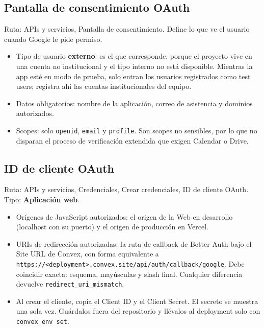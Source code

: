 \documentclass[11pt,a4paper]{article}
\begin{document}
\subsection{Pantalla de consentimiento OAuth}

Ruta: APIs y servicios, Pantalla de consentimiento. Define lo que ve el
usuario cuando Google le pide permiso.

\begin{itemize}
  \item Tipo de usuario \textbf{externo}: es el que corresponde, porque el
    proyecto vive en una cuenta no institucional y el tipo interno no está
    disponible. Mientras la app esté en modo de prueba, solo entran los
    usuarios registrados como test users; registra ahí las cuentas
    institucionales del equipo.
  \item Datos obligatorios: nombre de la aplicación, correo de asistencia y
    dominios autorizados.
  \item Scopes: solo \texttt{openid}, \texttt{email} y \texttt{profile}. Son
    scopes no sensibles, por lo que no disparan el proceso de verificación
    extendida que exigen Calendar o Drive.
\end{itemize}

\subsection{ID de cliente OAuth}

Ruta: APIs y servicios, Credenciales, Crear credenciales, ID de cliente
OAuth. Tipo: \textbf{Aplicación web}.

\begin{itemize}
  \item Orígenes de JavaScript autorizados: el origen de la Web en desarrollo
    (localhost con su puerto) y el origen de producción en Vercel.
  \item URIs de redirección autorizadas: la ruta de callback de Better Auth
    bajo el Site URL de Convex, con forma equivalente a
    \texttt{https://<deployment>.convex.site/api/auth/callback/google}.
    Debe coincidir exacta: esquema, mayúsculas y slash final. Cualquier
    diferencia devuelve \texttt{redirect\_uri\_mismatch}.
  \item Al crear el cliente, copia el Client ID y el Client Secret. El secreto
    se muestra una sola vez. Guárdalos fuera del repositorio y llévalos al
    deployment solo con \texttt{convex env set}.
\end{itemize}
\end{document}
